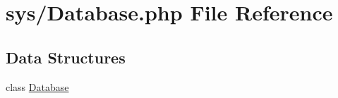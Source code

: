 \hypertarget{_database_8php}{}\section{sys/\+Database.php File Reference}
\label{_database_8php}
\subsection*{Data Structures}
\begin{DoxyCompactItemize}
\item 
class \hyperlink{class_database}{Database}
\end{DoxyCompactItemize}
